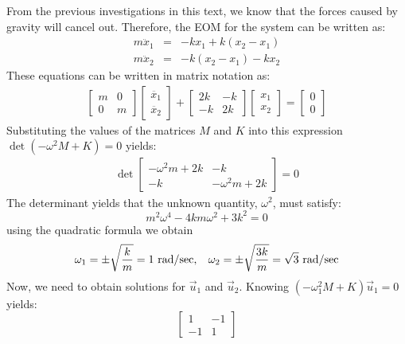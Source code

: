 \documentclass[12pt,letter]{article}
\begin{document}
\begin{example}
 From the previous investigations in this text, we know that the forces caused by gravity will cancel out. Therefore, the EOM for the system can be written as:
	\begin{eqnarray}
	m\ddot{x}_1 &= & -kx_1 + k(x_2-x_1) \\
	m\ddot{x}_2&= & -k(x_2-x_1) -kx_2 \nonumber
	\end{eqnarray}
	These equations can be written in matrix notation as:
	\begin{eqnarray}
		\begin{bmatrix} m & 0  \\  0 & m \end{bmatrix}\begin{bmatrix} \ddot{x_1} \\  \ddot{x_2} \end{bmatrix} + \begin{bmatrix} 2k & -k  \\  -k & 2k \end{bmatrix}\begin{bmatrix} x_1 \\  x_2 \end{bmatrix} = \begin{bmatrix} 0 \\  0 \end{bmatrix}
	\end{eqnarray}
	Substituting the values of the matrices $M$ and $K$ into this expression $\det(-\omega^2 M  + K) = 0$ yields: 
	\begin{eqnarray}
	\det\begin{bmatrix} -\omega^2 m + 2k & -k  \\  -k & -\omega^2 m + 2k \end{bmatrix}=0
	\end{eqnarray}
	The determinant yields that the unknown quantity, $\omega^2$, must satisfy:
	\begin{equation}
	m^2 \omega^4 - 4km\omega^2 + 3k^2 = 0
	\end{equation}
	using the quadratic formula we obtain
	\begin{equation}
	\omega_1 = \pm \sqrt{\frac{k}{m}}=1 \text{ rad/sec}, \hspace{2ex} \omega_2 = \pm \sqrt{\frac{3k}{m}}=\sqrt{3} \text{ rad/sec}
	\end{equation}
	Now, we need to obtain solutions for $\vec{u}_1$ and $\vec{u}_2$. Knowing $(-\omega_1^2 M  + K)\vec{u}_1 =0$ yields:
	\begin{equation}
		 \begin{bmatrix} 1 & -1 \\    -1  & 1 \end{bmatrix} 

\end{equation}
\end{example}
\end{document}
